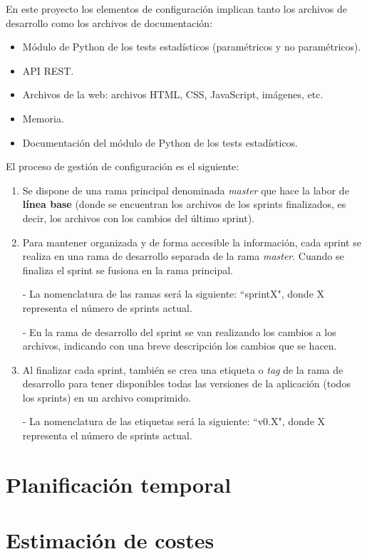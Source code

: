 \noindent
En este proyecto los elementos de configuración implican tanto los archivos de desarrollo como los archivos de documentación:
\begin{itemize}
\item Módulo de Python de los tests estadísticos (paramétricos y no paramétricos).
\item API REST.
\item Archivos de la web: archivos HTML, CSS, JavaScript, imágenes, etc.
\item Memoria.
\item Documentación del módulo de Python de los tests estadísticos.
\end{itemize}

\noindent
El proceso de gestión de configuración es el siguiente:
\begin{enumerate}
\item Se dispone de una rama principal denominada \textit{master} que hace la labor de \textbf{línea base} (donde se encuentran los archivos de los sprints finalizados, es decir, los archivos con los cambios del último sprint).
\item Para mantener organizada y de forma accesible la información, cada sprint se realiza en una rama de desarrollo separada de la rama \textit{master}. Cuando se finaliza el sprint se fusiona en la rama principal.

- La nomenclatura de las ramas será la siguiente: ``sprintX", donde X representa el número de sprints actual.

- En la rama de desarrollo del sprint se van realizando los cambios a los archivos, indicando con una breve descripción los cambios que se hacen.
\item Al finalizar cada sprint, también se crea una etiqueta o \textit{tag} de la rama de desarrollo para tener disponibles todas las versiones de la aplicación (todos los sprints) en un archivo comprimido.

- La nomenclatura de las etiquetas será la siguiente: ``v0.X", donde X representa el número de sprints actual.
\end{enumerate}

\section{Planificación temporal}

\section{Estimación de costes}
